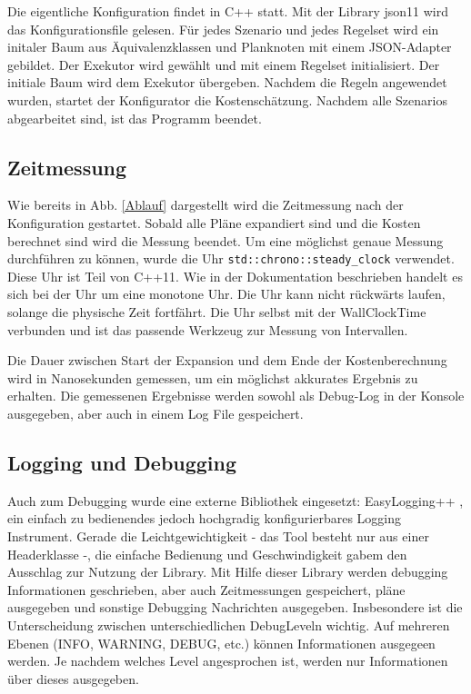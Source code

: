 Die eigentliche Konfiguration findet in C++ statt. Mit der Library json11 \cite{json11} wird das Konfigurationsfile gelesen. Für jedes Szenario und jedes Regelset wird ein initaler Baum aus Äquivalenzklassen und Planknoten mit einem JSON-Adapter gebildet. Der Exekutor wird gewählt und mit einem Regelset initialisiert. Der initiale Baum wird dem Exekutor übergeben. Nachdem die Regeln angewendet wurden, startet der Konfigurator die Kostenschätzung. Nachdem alle Szenarios abgearbeitet sind, ist das Programm beendet.

\subsection{Zeitmessung}
Wie bereits in Abb. \ref{Ablauf} dargestellt wird die Zeitmessung nach der Konfiguration gestartet. Sobald alle Pläne expandiert sind und die Kosten berechnet sind wird die Messung beendet. Um eine möglichst genaue Messung durchführen zu können, wurde die Uhr \texttt{std::chrono::steady\_clock} verwendet. Diese Uhr ist Teil von C++11. Wie in der Dokumentation \cite{cppreference_2015_clock} beschrieben handelt es sich bei der Uhr um eine monotone Uhr. Die Uhr kann nicht rückwärts laufen, solange die physische Zeit fortfährt. Die Uhr selbst mit der Wall\-Clock\-Time verbunden und ist das passende Werkzeug zur Messung von Intervallen. 

Die Dauer zwischen Start der Expansion und dem Ende der Kostenberechnung wird in Nanosekunden gemessen, um ein möglichst akkurates Ergebnis zu erhalten. Die gemessenen Ergebnisse werden sowohl als Debug-Log in der Konsole ausgegeben, aber auch in einem Log File gespeichert.



\subsection{Logging und Debugging}

Auch zum Debugging wurde eine externe Bibliothek eingesetzt: EasyLogging++ \cite{easylogging}, ein einfach zu bedienendes jedoch hochgradig konfigurierbares Logging Instrument. Gerade die Leichtgewichtigkeit - das Tool besteht nur aus einer Headerklasse -, die einfache Bedienung und Geschwindigkeit gabem den Ausschlag zur Nutzung der Library. Mit Hilfe dieser Library werden debugging Informationen geschrieben, aber auch Zeitmessungen gespeichert, pläne ausgegeben und sonstige Debugging Nachrichten ausgegeben. Insbesondere ist die Unterscheidung zwischen unterschiedlichen Debug\-Leveln wichtig. Auf mehreren Ebenen (INFO, WARNING, DEBUG, etc.) können Informationen ausgegeen werden. Je nachdem welches Level angesprochen ist, werden nur Informationen über dieses ausgegeben. 


